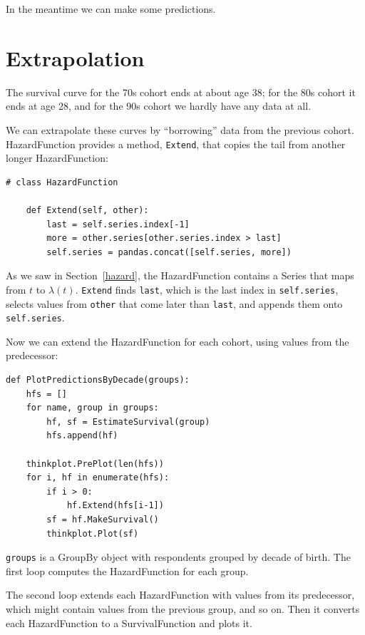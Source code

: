 \documentclass[12pt]{book}
\begin{document}
In the meantime we can make some predictions.


\section{Extrapolation}

The survival curve for the 70s cohort ends at about age 38;
for the 80s cohort it ends at age 28, and for the 90s cohort
we hardly have any data at all.

We can extrapolate these curves by ``borrowing'' data from the
previous cohort.  HazardFunction provides a method, {\tt Extend}, that
copies the tail from another longer HazardFunction:

\begin{verbatim}
# class HazardFunction

    def Extend(self, other):
        last = self.series.index[-1]
        more = other.series[other.series.index > last]
        self.series = pandas.concat([self.series, more])
\end{verbatim}

As we saw in Section~\ref{hazard}, the HazardFunction contains a Series
that maps from $t$ to $\lambda(t)$.  {\tt Extend} finds {\tt last},
which is the last index in {\tt self.series}, selects values from
{\tt other} that come later than {\tt last}, and appends them
onto {\tt self.series}.

Now we can extend the HazardFunction for each cohort, using values
from the predecessor:

\begin{verbatim}
def PlotPredictionsByDecade(groups):
    hfs = []
    for name, group in groups:
        hf, sf = EstimateSurvival(group)
        hfs.append(hf)

    thinkplot.PrePlot(len(hfs))
    for i, hf in enumerate(hfs):
        if i > 0:
            hf.Extend(hfs[i-1])
        sf = hf.MakeSurvival()
        thinkplot.Plot(sf)
\end{verbatim}

{\tt groups} is a GroupBy object with respondents grouped by decade of
birth.  The first loop computes the HazardFunction for each group.

The second loop extends each HazardFunction with values from
its predecessor, which might contain values from the previous
group, and so on.  Then it converts each HazardFunction to
a SurvivalFunction and plots it.
\end{document}
